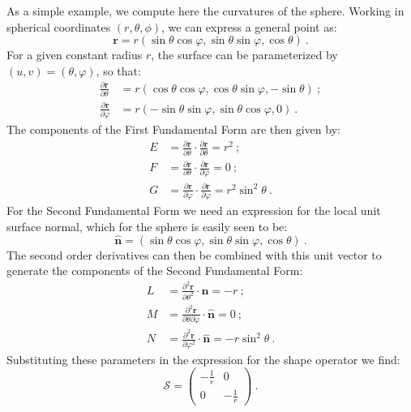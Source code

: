 As a simple example, we compute here the curvatures of the sphere.  Working in spherical coordinates $(r,\theta,\phi)$, we can express a general point as:
\[
	\mathbf{r} = r(\sin\theta\cos\varphi,\sin\theta\sin\varphi,\cos\theta)\ .
\]
For a given constant radius $r$, the surface can be parameterized by $(u,v)=(\theta,\varphi)$, so that:
\begin{equation*}
\begin{split}
	\frac{\partial \mathbf{r}}{\partial \theta} &= r(\cos\theta\cos\varphi,\cos\theta\sin\varphi,-\sin\theta)\ ;\\
	\frac{\partial \mathbf{r}}{\partial \varphi} &= r(-\sin\theta\sin\varphi,\sin\theta\cos\varphi,0)\ .
\end{split}
\end{equation*}
The components of the First Fundamental Form are then given by:
\begin{equation*}
\begin{split}
	E &= \frac{\partial \mathbf{r}}{\partial \theta}\cdot\frac{\partial \mathbf{r}}{\partial \theta} = r^2\ ;\\
	F &= \frac{\partial \mathbf{r}}{\partial \theta}\cdot\frac{\partial \mathbf{r}}{\partial \varphi}=0\ ;\\
	G &= \frac{\partial \mathbf{r}}{\partial \varphi}\cdot\frac{\partial \mathbf{r}}{\partial \varphi}=r^2\sin^2\theta \ .
\end{split}
\end{equation*}
For the Second Fundamental Form we need an expression for the local unit surface normal, which for the sphere is easily seen to be:
\[
	\hat{\mathbf{n}} = (\sin\theta\cos\varphi,\sin\theta\sin\varphi,\cos\theta)\ .
\]
The second order derivatives can then be combined with this unit vector to generate the components of the Second Fundamental Form:
\begin{equation*}
\begin{split}
	L &= \frac{\partial^2 \mathbf{r}}{\partial \theta^2}\cdot \hat{\mathbf{n}}=-r\ ;\\
	M &= \frac{\partial^2 \mathbf{r}}{\partial \theta\partial \varphi}\cdot \hat{\mathbf{n}}=0\ ;\\
	N&= \frac{\partial^2 \mathbf{r}}{\partial \varphi^2}\cdot \hat{\mathbf{n}}=-r\sin^2\theta\ .
\end{split}
\end{equation*}
Substituting these parameters in the expression for the shape operator we find:
\[
	\mathcal{S} = \begin{pmatrix} -\frac{1}{r} & 0\\ 0&-\frac{1}{r} \end{pmatrix}\ .
\]
